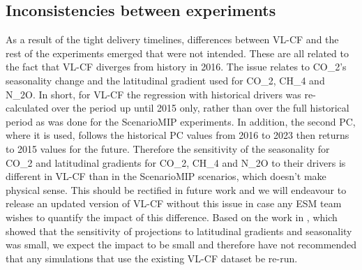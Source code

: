 \subsection{Inconsistencies between experiments}
\label{ssec:discussion-inconsistencies-experiments}

As a result of the tight delivery timelines,
differences between VL-CF and the rest of the experiments emerged that were not intended.
These are all related to the fact that VL-CF diverges from history in 2016.
The issue relates to CO_2's seasonality change and the latitudinal gradient used for CO_2, CH_4 and N_2O.
In short, for VL-CF the regression with historical drivers was re-calculated over the period up until 2015 only,
rather than over the full historical period as was done for the ScenarioMIP experiments.
In addition, the second PC, where it is used,
follows the historical PC values from 2016 to 2023 then returns to 2015 values for the future.
Therefore the sensitivity of the seasonality for CO_2 and latitudinal gradients for CO_2, CH_4 and N_2O
to their drivers is different in VL-CF than in the ScenarioMIP scenarios, which doesn't make physical sense.
This should be rectified in future work and we will endeavour to release an updated version of VL-CF without this issue in case any ESM team wishes to quantify the impact of this difference.
Based on the work in \citet{meinshausen_ssp-ghgs_2020},
which showed that the sensitivity of projections to latitudinal gradients and seasonality was small,
we expect the impact to be small and therefore have not recommended that any simulations that use the existing VL-CF dataset be re-run.


